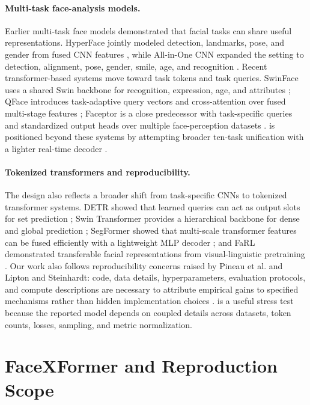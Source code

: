 \paragraph{Multi-task face-analysis models.}
Earlier multi-task face models demonstrated that facial tasks can share useful representations. HyperFace jointly modeled detection, landmarks, pose, and gender from fused CNN features \citep{hyperface2019}, while All-in-One CNN expanded the setting to detection, alignment, pose, gender, smile, age, and recognition \citep{allinone2017}. Recent transformer-based systems move toward task tokens and task queries. SwinFace uses a shared Swin backbone for recognition, expression, age, and attributes \citep{swinface2024}; QFace introduces task-adaptive query vectors and cross-attention over fused multi-stage features \citep{qface2024}; Faceptor is a close predecessor with task-specific queries and standardized output heads over multiple face-perception datasets \citep{faceptor2024}. \method is positioned beyond these systems by attempting broader ten-task unification with a lighter real-time decoder \citep{facexformer2025}.

\paragraph{Tokenized transformers and reproducibility.}
The design also reflects a broader shift from task-specific CNNs to tokenized transformer systems. DETR showed that learned queries can act as output slots for set prediction \citep{detr2020}; Swin Transformer provides a hierarchical backbone for dense and global prediction \citep{swin2021}; SegFormer showed that multi-scale transformer features can be fused efficiently with a lightweight MLP decoder \citep{segformer2021}; and FaRL demonstrated transferable facial representations from visual-linguistic pretraining \citep{farl2022}. Our work also follows reproducibility concerns raised by Pineau et al. and Lipton and Steinhardt: code, data details, hyperparameters, evaluation protocols, and compute descriptions are necessary to attribute empirical gains to specified mechanisms rather than hidden implementation choices \citep{pineau2021,lipton2018}. \method is a useful stress test because the reported model depends on coupled details across datasets, token counts, losses, sampling, and metric normalization.

\section{FaceXFormer and Reproduction Scope}

